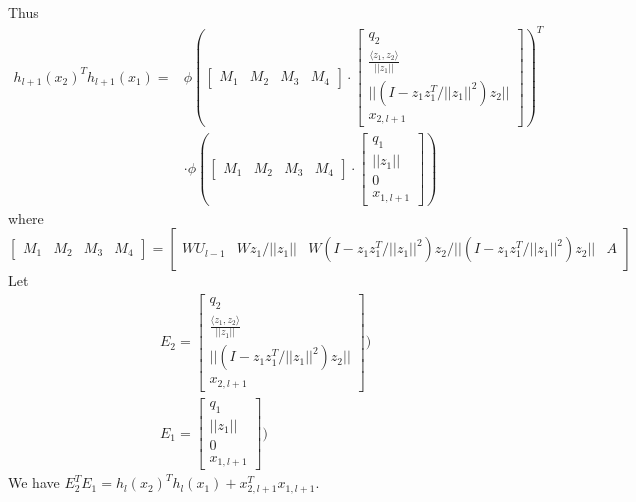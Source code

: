 \documentclass{article}
\begin{document}
Thus
\begin{equation}
\begin{aligned}
h_{l+1}(x_2)^Th_{l+1}(x_1)=&\phi(
\begin{bmatrix}
M_1 &M_2 & M_3&M_4
\end{bmatrix}
\cdot
\begin{bmatrix}
q_2\\
\frac{\langle z_1,z_2\rangle }{||z_1||}\\
||(I-z_1z_1^T/||z_1||^2)z_2||\\
x_{2,l+1}
\end{bmatrix})^T\\
&\cdot\phi(
\begin{bmatrix}
M_1 &M_2 & M_3&M_4
\end{bmatrix}
\cdot
\begin{bmatrix}
q_1\\
||z_1||\\
0\\
x_{1,l+1}
\end{bmatrix})
\end{aligned}
\end{equation}
where 
\begin{equation}
\begin{bmatrix}
M_1 &M_2 & M_3&M_4
\end{bmatrix} 
=
\begin{bmatrix}
WU_{l-1} &W z_1/||z_1|| & W(I-z_1z_1^T/||z_1||^2)z_2/||(I-z_1z_1^T/||z_1||^2)z_2||&A
\end{bmatrix} 
\end{equation}
Let 
\begin{equation}
\begin{aligned}
&E_2=\begin{bmatrix}
q_2\\
\frac{\langle z_1,z_2\rangle }{||z_1||}\\
||(I-z_1z_1^T/||z_1||^2)z_2||\\
x_{2,l+1}
\end{bmatrix})\\
&E_1=\begin{bmatrix}
q_1\\
||z_1||\\
0\\
x_{1,l+1}
\end{bmatrix})
\end{aligned}
\end{equation}
We have $E_2^TE_1=h_{l}(x_2)^Th_{l}(x_1)+x_{2,l+1}^Tx_{1,l+1}$.
\end{document}
